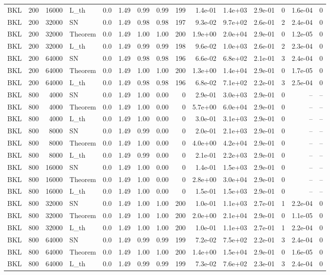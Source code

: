 \begin{tabular}{lrrlrrrrrrrrrrr}
BKL & 200 & 16000 & L\_th & 0.0 & 1.49 & 0.99 & 0.99 & 199 & 1.4e-01 & 1.4e+03 & 2.9e-01 & 0 & 1.6e-04 & 0 \\
BKL & 200 & 32000 & SN & 0.0 & 1.49 & 0.98 & 0.98 & 197 & 9.3e-02 & 9.7e+02 & 2.6e-01 & 2 & 2.4e-04 & 0 \\
BKL & 200 & 32000 & Theorem & 0.0 & 1.49 & 1.00 & 1.00 & 200 & 1.9e+00 & 2.0e+04 & 2.9e-01 & 0 & 1.2e-05 & 0 \\
BKL & 200 & 32000 & L\_th & 0.0 & 1.49 & 0.99 & 0.99 & 198 & 9.6e-02 & 1.0e+03 & 2.6e-01 & 2 & 2.3e-04 & 0 \\
BKL & 200 & 64000 & SN & 0.0 & 1.49 & 0.98 & 0.98 & 196 & 6.6e-02 & 6.8e+02 & 2.1e-01 & 3 & 2.4e-04 & 0 \\
BKL & 200 & 64000 & Theorem & 0.0 & 1.49 & 1.00 & 1.00 & 200 & 1.3e+00 & 1.4e+04 & 2.9e-01 & 0 & 1.7e-05 & 0 \\
BKL & 200 & 64000 & L\_th & 0.0 & 1.49 & 0.98 & 0.98 & 196 & 6.8e-02 & 7.1e+02 & 2.2e-01 & 3 & 2.5e-04 & 0 \\
BKL & 800 & 4000 & SN & 0.0 & 1.49 & 1.00 & 0.00 & 0 & 2.9e-01 & 3.0e+03 & 2.9e-01 & 0 & -- & -- \\
BKL & 800 & 4000 & Theorem & 0.0 & 1.49 & 1.00 & 0.00 & 0 & 5.7e+00 & 6.0e+04 & 2.9e-01 & 0 & -- & -- \\
BKL & 800 & 4000 & L\_th & 0.0 & 1.49 & 1.00 & 0.00 & 0 & 3.0e-01 & 3.1e+03 & 2.9e-01 & 0 & -- & -- \\
BKL & 800 & 8000 & SN & 0.0 & 1.49 & 0.99 & 0.00 & 0 & 2.0e-01 & 2.1e+03 & 2.9e-01 & 0 & -- & -- \\
BKL & 800 & 8000 & Theorem & 0.0 & 1.49 & 1.00 & 0.00 & 0 & 4.0e+00 & 4.2e+04 & 2.9e-01 & 0 & -- & -- \\
BKL & 800 & 8000 & L\_th & 0.0 & 1.49 & 0.99 & 0.00 & 0 & 2.1e-01 & 2.2e+03 & 2.9e-01 & 0 & -- & -- \\
BKL & 800 & 16000 & SN & 0.0 & 1.49 & 1.00 & 0.00 & 0 & 1.4e-01 & 1.5e+03 & 2.9e-01 & 0 & -- & -- \\
BKL & 800 & 16000 & Theorem & 0.0 & 1.49 & 1.00 & 0.00 & 0 & 2.8e+00 & 3.0e+04 & 2.9e-01 & 0 & -- & -- \\
BKL & 800 & 16000 & L\_th & 0.0 & 1.49 & 1.00 & 0.00 & 0 & 1.5e-01 & 1.5e+03 & 2.9e-01 & 0 & -- & -- \\
BKL & 800 & 32000 & SN & 0.0 & 1.49 & 1.00 & 1.00 & 200 & 1.0e-01 & 1.1e+03 & 2.7e-01 & 1 & 2.2e-04 & 0 \\
BKL & 800 & 32000 & Theorem & 0.0 & 1.49 & 1.00 & 1.00 & 200 & 2.0e+00 & 2.1e+04 & 2.9e-01 & 0 & 1.1e-05 & 0 \\
BKL & 800 & 32000 & L\_th & 0.0 & 1.49 & 1.00 & 1.00 & 200 & 1.0e-01 & 1.1e+03 & 2.7e-01 & 1 & 2.2e-04 & 0 \\
BKL & 800 & 64000 & SN & 0.0 & 1.49 & 0.99 & 0.99 & 199 & 7.2e-02 & 7.5e+02 & 2.2e-01 & 3 & 2.4e-04 & 0 \\
BKL & 800 & 64000 & Theorem & 0.0 & 1.49 & 1.00 & 1.00 & 200 & 1.4e+00 & 1.5e+04 & 2.9e-01 & 0 & 1.6e-05 & 0 \\
BKL & 800 & 64000 & L\_th & 0.0 & 1.49 & 0.99 & 0.99 & 199 & 7.3e-02 & 7.6e+02 & 2.3e-01 & 3 & 2.4e-04 & 0 \\
\hline
\end{tabular}
